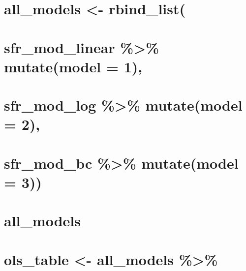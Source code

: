 \documentclass[]{article}
\begin{document}
\hypertarget{section-5}{%
\section{}\label{section-5}}

\hypertarget{all_models---rbind_list}{%
\section{all\_models \textless{}-
rbind\_list(}\label{all_models---rbind_list}}

\hypertarget{sfr_mod_linear-mutatemodel-1}{%
\section{sfr\_mod\_linear \%\textgreater{}\% mutate(model =
1),}\label{sfr_mod_linear-mutatemodel-1}}

\hypertarget{sfr_mod_log-mutatemodel-2}{%
\section{sfr\_mod\_log \%\textgreater{}\% mutate(model =
2),}\label{sfr_mod_log-mutatemodel-2}}

\hypertarget{sfr_mod_bc-mutatemodel-3}{%
\section{sfr\_mod\_bc \%\textgreater{}\% mutate(model =
3))}\label{sfr_mod_bc-mutatemodel-3}}

\hypertarget{section-6}{%
\section{}\label{section-6}}

\hypertarget{all_models}{%
\section{all\_models}\label{all_models}}

\hypertarget{section-7}{%
\section{}\label{section-7}}

\hypertarget{ols_table---all_models}{%
\section{ols\_table \textless{}- all\_models
\%\textgreater{}\%}\label{ols_table---all_models}}
\end{document}
